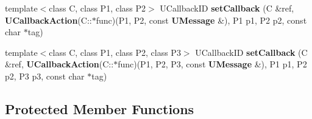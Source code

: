 \begin{CompactItemize}
\item 
template$<$class C, class P1, class P2$>$ UCallback\-ID {\bf set\-Callback} (C \&ref, {\bf UCallback\-Action}(C::$\ast$func)(P1, P2, const {\bf UMessage} \&), P1 p1, P2 p2, const char $\ast$tag)\label{classUAbstractClient_a37}

\item 
template$<$class C, class P1, class P2, class P3$>$ UCallback\-ID {\bf set\-Callback} (C \&ref, {\bf UCallback\-Action}(C::$\ast$func)(P1, P2, P3, const {\bf UMessage} \&), P1 p1, P2 p2, P3 p3, const char $\ast$tag)\label{classUAbstractClient_a38}

\end{CompactItemize}
\subsection*{Protected Member Functions}
